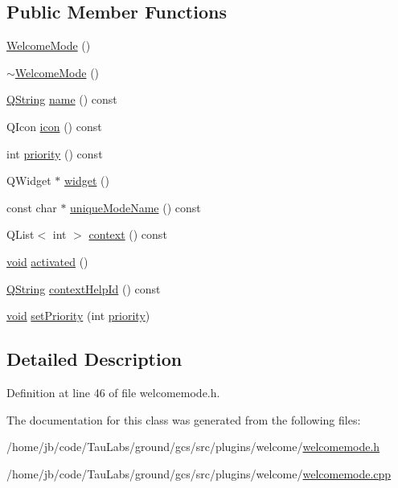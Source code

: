 \subsection*{\-Public \-Member \-Functions}
\begin{DoxyCompactItemize}
\item 
\hyperlink{group___welcome_plugin_gaddea844272aa36b99c5ebe5e095a70ab}{\-Welcome\-Mode} ()
\item 
\hyperlink{group___welcome_plugin_ga5c6c667541394b36ddf50c9ae263f9b2}{$\sim$\-Welcome\-Mode} ()
\item 
\hyperlink{group___u_a_v_objects_plugin_gab9d252f49c333c94a72f97ce3105a32d}{\-Q\-String} \hyperlink{group___welcome_plugin_ga7586dbc104467d1a590fa2e0d723ab5c}{name} () const 
\item 
\-Q\-Icon \hyperlink{group___welcome_plugin_ga88caad9f6c1d3a4d16f7ee399706cf86}{icon} () const 
\item 
int \hyperlink{group___welcome_plugin_gae1d1437fdc5e83102dc1da5cc809834f}{priority} () const 
\item 
\-Q\-Widget $\ast$ \hyperlink{group___welcome_plugin_gad367aa736459da2ada111a3944f2a28d}{widget} ()
\item 
const char $\ast$ \hyperlink{group___welcome_plugin_gaddd517d76cbff2b9bb0c8e0d672bdcab}{unique\-Mode\-Name} () const 
\item 
\-Q\-List$<$ int $>$ \hyperlink{group___welcome_plugin_ga740b152623be8ca1d5f9f22e2b4b5bc4}{context} () const 
\item 
\hyperlink{group___u_a_v_objects_plugin_ga444cf2ff3f0ecbe028adce838d373f5c}{void} \hyperlink{group___welcome_plugin_gac79769eb6bfa95dfa1be3459b92e1d60}{activated} ()
\item 
\hyperlink{group___u_a_v_objects_plugin_gab9d252f49c333c94a72f97ce3105a32d}{\-Q\-String} \hyperlink{group___welcome_plugin_ga5350ee5cd5a50d966eb0b2522e888183}{context\-Help\-Id} () const 
\item 
\hyperlink{group___u_a_v_objects_plugin_ga444cf2ff3f0ecbe028adce838d373f5c}{void} \hyperlink{group___welcome_plugin_ga5e3a43a28b1cf87122fbb4a8872acb69}{set\-Priority} (int \hyperlink{group___welcome_plugin_gae1d1437fdc5e83102dc1da5cc809834f}{priority})
\end{DoxyCompactItemize}


\subsection{\-Detailed \-Description}


\-Definition at line 46 of file welcomemode.\-h.



\-The documentation for this class was generated from the following files\-:\begin{DoxyCompactItemize}
\item 
/home/jb/code/\-Tau\-Labs/ground/gcs/src/plugins/welcome/\hyperlink{welcomemode_8h}{welcomemode.\-h}\item 
/home/jb/code/\-Tau\-Labs/ground/gcs/src/plugins/welcome/\hyperlink{welcomemode_8cpp}{welcomemode.\-cpp}\end{DoxyCompactItemize}
